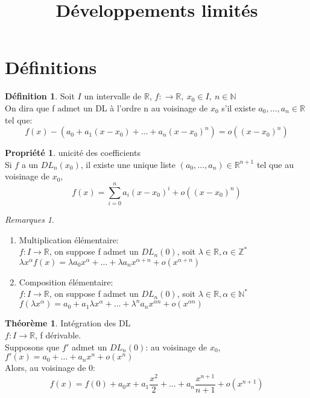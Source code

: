 \documentclass[fleqn]{article}
\title{D\'eveloppements limit\'es}
\date{}
\theoremstyle{definition} \newtheorem*{defi}{D\'efinition}
\theoremstyle{definition} \newtheorem*{theo}{Th\'eor\`eme}
\theoremstyle{definition} \newtheorem*{prop}{Propri\'et\'e}
\theoremstyle{definition} \newtheorem*{coro}{Corollaire}
\theoremstyle{remark} \newtheorem*{rqs}{Remarques}
\begin{document}
\maketitle

\section{D\'efinitions}
\begin{defi}
	Soit $I$ un intervalle de $\mathbb{R}$, $f:\rightarrow \mathbb{R},\ x_0 \in I,\ n \in \mathbb{N}$ \\
	On dira que f admet un DL \`a l'ordre n au voisinage de $x_0$ s'il existe $a_0, \hdots, a_n \in \mathbb{R}$ tel que: \\
	\[f(x) - (a_0 + a_1(x-x_0) + \hdots + a_n(x-x_0)^n) = o((x-x_0)^n)\]
\end{defi}

\begin{prop} unicit\'e des coefficients \\
	Si $f$ a un $DL_n(x_0)$, il existe une unique liste $(a_0, \hdots, a_n) \in \mathbb{R}^{n+1}$ tel que au voisinage de $x_0$,
	\[f(x) = \sum_{i=0}^{n} a_i(x-x_0)^i  + o((x-x_0)^n)\]
\end{prop}

\begin{rqs}
	$\ $
	\begin{enumerate}
		\item Multiplication \'el\'ementaire: \\
		$f: I \rightarrow \mathbb{R}$, on suppose f admet un $DL_n(0)$, soit $\lambda \in \mathbb{R}, \alpha \in \mathbb{Z}^{*}$ \\
		$\lambda x^{\alpha} f(x) = \lambda a_0 x^{\alpha} + \hdots + \lambda a_n x^{\alpha+n} + o(x^{\alpha + n})$
		\item Composition \'el\'ementaire: \\
		$f: I \rightarrow \mathbb{R}$, on suppose f admet un $DL_n(0)$, soit $\lambda \in \mathbb{R}, \alpha \in \mathbb{N}^*$ \\
		$f(\lambda x^{\alpha}) = a_0 + a_1 \lambda x^{\alpha} + \hdots + \lambda ^n a_n x^{\alpha n} + o(x^{\alpha n})$
	\end{enumerate}
\end{rqs}

\begin{theo} Int\'egration des DL \\
	$f: I \rightarrow \mathbb{R}$, f d\'erivable. \\
	Supposons que $f'$ admet un $DL_n(0)$: au voisinage de $x_0$, \\
	$f'(x) = a_0 + \hdots + a_n x^{n} + o(x^n)$ \\
	Alors, au voisinage de $0$: 
	\[f(x) = f(0) + a_0 x + a_1 \frac{x^2}{2} + \hdots + a_n \frac{x^{n+1}}{n+1} + o(x^{n+1})\]
\end{theo}
\end{document}

